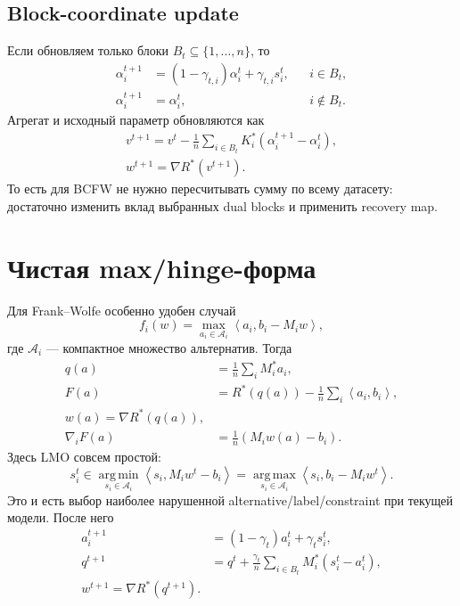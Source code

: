 \documentclass[11pt,a4paper]{article}
\newcommand{\A}{\mathcal{A}}
\newcommand{\ip}[2]{\left\langle #1,#2\right\rangle}
\newcommand{\argmin}{\operatorname*{arg\,min}}
\newcommand{\argmax}{\operatorname*{arg\,max}}
\begin{document}
\subsection{Block-coordinate update}

Если обновляем только блоки \(B_t\subseteq\{1,\ldots,n\}\), то
\begin{align}
  \alpha_i^{t+1}
  &=(1-\gamma_{t,i})\alpha_i^t+\gamma_{t,i}s_i^t,
  &&i\in B_t,\\
  \alpha_i^{t+1}&=\alpha_i^t,
  &&i\notin B_t.
\end{align}
Агрегат и исходный параметр обновляются как
\begin{align}
  \boxed{
  v^{t+1}=v^t-\frac1n\sum_{i\in B_t}
  K_i^*(\alpha_i^{t+1}-\alpha_i^t),}
  \label{eq:v-block}\\
  \boxed{w^{t+1}=\nabla R^*(v^{t+1}).}
  \label{eq:w-block}
\end{align}
То есть для BCFW не нужно пересчитывать сумму по всему датасету: достаточно изменить вклад выбранных dual blocks и применить recovery map.

\section{Чистая max/hinge-форма}

Для Frank--Wolfe особенно удобен случай
\begin{equation}
  \label{eq:max-form}
  f_i(w)=\max_{a_i\in\A_i}
  \ip{a_i}{b_i-M_iw},
\end{equation}
где \(\A_i\) --- компактное множество альтернатив. Тогда
\begin{align}
  q(a)&=\frac1n\sum_iM_i^*a_i,\\
  F(a)&=R^*(q(a))-\frac1n\sum_i\ip{a_i}{b_i},
  \label{eq:max-dual}\\
  \boxed{w(a)=\nabla R^*(q(a)),}
  \label{eq:max-recovery}\\
  \nabla_iF(a)&=\frac1n(M_iw(a)-b_i).
\end{align}
Здесь LMO совсем простой:
\begin{equation}
  \label{eq:max-lmo}
  \boxed{
  s_i^t\in\argmin_{s_i\in\A_i}
  \ip{s_i}{M_iw^t-b_i}
  =\argmax_{s_i\in\A_i}
  \ip{s_i}{b_i-M_iw^t}.}
\end{equation}
Это и есть выбор наиболее нарушенной alternative/label/constraint при текущей модели. После него
\begin{align}
  a_i^{t+1}&=(1-\gamma_t)a_i^t+\gamma_ts_i^t,\\
  q^{t+1}&=q^t+\frac{\gamma_t}{n}
  \sum_{i\in B_t}M_i^*(s_i^t-a_i^t),
  \label{eq:q-update}\\
  \boxed{w^{t+1}=\nabla R^*(q^{t+1}).}
\end{align}
\end{document}
